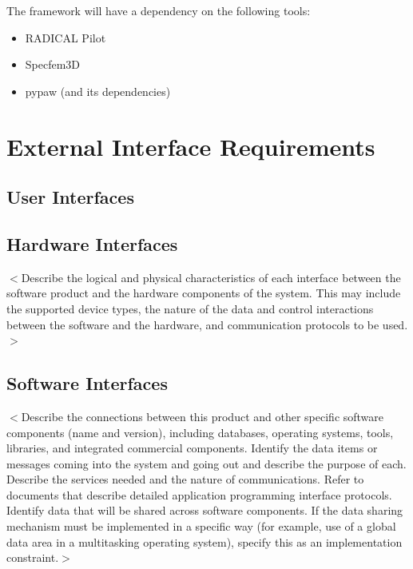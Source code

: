 \documentclass{scrreprt}
\begin{document}
The framework will have a dependency on the following tools:

\begin{itemize}[noitemsep]
\item RADICAL Pilot
\item Specfem3D
\item pypaw (and its dependencies)
\end{itemize}
\chapter{External Interface Requirements}

\section{User Interfaces}



\section{Hardware Interfaces}
$<$Describe the logical and physical characteristics of each interface between 
the software product and the hardware components of the system. This may include 
the supported device types, the nature of the data and control interactions 
between the software and the hardware, and communication protocols to be 
used.$>$

\section{Software Interfaces}
$<$Describe the connections between this product and other specific software 
components (name and version), including databases, operating systems, tools, 
libraries, and integrated commercial components. Identify the data items or 
messages coming into the system and going out and describe the purpose of each.  
Describe the services needed and the nature of communications. Refer to 
documents that describe detailed application programming interface protocols.  
Identify data that will be shared across software components. If the data 
sharing mechanism must be implemented in a specific way (for example, use of a 
global data area in a multitasking operating system), specify this as an 
implementation constraint.$>$
\end{document}
